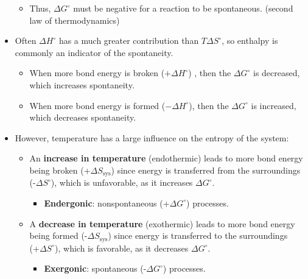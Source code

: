 \documentclass[12pt,a4paper]{article}
\begin{document}
\begin{itemize}
\begin{itemize}
            \item Thus, {\color{o-Sun}\(\Delta G^\circ\) must be {\color{neg}negative} for  a reaction to be spontaneous.} (second law of thermodynamics)
        \end{itemize}
    \item Often {\color{surr}\(\Delta H^\circ\)} has a {\color{o-Sun}much greater contribution} than {\color{sys}\(T\Delta S^\circ\)}, so enthalpy is commonly an indicator of the spontaneity.
        \begin{itemize}
            \item When more bond energy is {\color{pos}broken (\(+\Delta H^\circ\)) }, then the \(\Delta G^\circ\) is {\color{neg}decreased}, which {\color{pos}increases spontaneity}.
            \item When more bond energy is {\color{neg}formed (\(-\Delta H^\circ\))}, then the \(\Delta G^\circ\) is {\color{pos}increased}, which {\color{neg}decreases spontaneity}.
        \end{itemize}
    \item However, temperature has a large influence on the entropy of the system:
        \begin{itemize}
            \item An {\color{pos} \textbf{increase in temperature} (endothermic)} leads to more bond energy being {\color{pos}broken (+\(\Delta S_{\text{sys}}\))} since energy is transferred {\color{pos}from} the surroundings {\color{neg}(-\(\Delta S^\circ\))}, which is {\color{o-Sun}unfavorable}, as it {\color{pos}increases \(\Delta G^\circ\)}. 
                \begin{itemize}
                    \item {\color{pos}\textbf{Endergonic}}: {\color{o-Sun}nonspontaneous} ({\color{pos}+\(\Delta G^\circ\)}) processes. 
                \end{itemize}
            \item A {\color{neg}\textbf{decrease in temperature} (exothermic)} leads to more bond energy being {\color{neg}formed (-\(\Delta S_{\text{sys}}\))} since energy is transferred {\color{neg}to} the surroundings \\ {\color{pos}(+\(\Delta S^\circ\))}, which is {\color{o-Sun}favorable}, as it {\color{neg}decreases \(\Delta G^\circ\)}.
                \begin{itemize}
                    \item {\color{neg}\textbf{Exergonic}}: {\color{o-Sun}spontaneous} ({\color{neg}-\(\Delta G^\circ\)}) processes.
                \end{itemize}
        \end{itemize}
\end{itemize}
\end{document}
